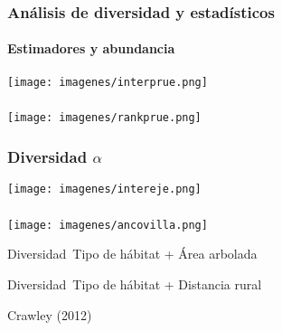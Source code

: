 \documentclass[compress]{beamer}
\begin{document}


{
\begin{frame}
\frametitle{Análisis de diversidad y estadísticos }
\framesubtitle{Estimadores y abundancia}
\begin{center}
\texttt{[image: imagenes/interprue.png]}
\end{center}

\end{frame}
}

{
\begin{frame}
\frametitle{ }
\begin{center}
\texttt{[image: imagenes/rankprue.png]}
\end{center}

\end{frame}
}

{
\begin{frame}
\frametitle{Diversidad $\alpha$ }
\begin{center}
\texttt{[image: imagenes/intereje.png]}
\end{center}

\end{frame}
}

{
\begin{frame}
\frametitle{}
\vspace{-1cm}

\begin{center}
\texttt{[image: imagenes/ancovilla.png]}
\end{center}
\begin{itemize}
\normalsize{\item Diversidad~Tipo de hábitat + Área arbolada}
\normalsize{\item Diversidad~Tipo de hábitat + Distancia rural}
\normalsize{\item Crawley (2012)}

\end{itemize}
\end{frame}
}
\end{document}

